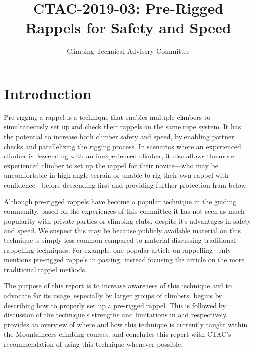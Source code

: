 \documentclass[nonacm,acmtog]{acmart}
\title{CTAC-2019-03: Pre-Rigged Rappels for Safety and Speed}
\subtitle{Climbing Technical Advisory Committee}
\begin{document}
\maketitle

\section{Introduction}
\label{sec:intro}

  Pre-rigging a rappel is a technique that enables multiple climbers to
  simultaneously set up and check their rappels on the same rope system.  It
  has the potential to increase both climber safety and speed, by enabling
  partner checks and parallelizing the rigging process.  In scenarios where an
  experienced climber is descending with an inexperienced climber, it also
  allows the more experienced climber to set up the rappel for their
  novice---who may be uncomfortable in high angle terrain or unable to rig
  their own rappel with confidence---before descending first and providing
  further protection from below.

  Although pre-rigged rappels have become a popular technique in the guiding
  community, based on the experiences of this committee it has not seen as much
  popularity with private parties or climbing clubs, despite it's advantages in
  safety and speed.  We suspect this may be because publicly available material
  on this technique is simply less common compared to material discussing
  traditional rappelling techniques.  For example, one popular article on
  rappelling~\cite{www:aac-rappelling} only mentions pre-rigged rappels in
  passing, instead focusing the article on the more traditional rappel methods.

  The purpose of this report is to increase awareness of this technique and to
  advocate for its usage, especially by larger groups of climbers.
   begins by describing how to properly set up a pre-rigged
  rappel.  This is followed by discussion of the technique's strengths and
  limitations in  and 
  respectively.  \TODO {} provides an overview of where and
  how this technique is currently taught within the Mountaineers climbing
  courses, and  concludes this report with CTAC's
  recommendation of using this technique whenever possible.
\end{document}
